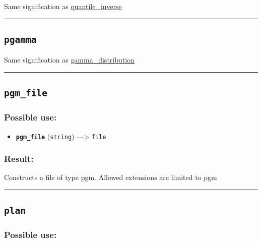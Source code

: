 \documentclass[]{book}
\providecommand{\tightlist}{%
  \setlength{\itemsep}{0pt}\setlength{\parskip}{0pt}}
\theoremstyle{definition}
\theoremstyle{definition}
\theoremstyle{definition}
\theoremstyle{remark}
\begin{document}
Same signification as
\href{OperatorsNR\#quantile_inverse}{quantile\_inverse}

\begin{center}\rule{0.5\linewidth}{\linethickness}\end{center}

\subsection{\texorpdfstring{\texttt{pgamma}}{pgamma}}\label{pgamma}

Same signification as
\href{OperatorsDH\#gamma_distribution}{gamma\_distribution}

\begin{center}\rule{0.5\linewidth}{\linethickness}\end{center}

\subsection{\texorpdfstring{\texttt{pgm\_file}}{pgm\_file}}\label{pgm_file}

\subsubsection{Possible use:}\label{possible-use-399}

\begin{itemize}
\tightlist
\item
  \textbf{\texttt{pgm\_file}} (\texttt{string}) ---\textgreater{}
  \texttt{file}
\end{itemize}

\subsubsection{Result:}\label{result-385}

Constructs a file of type pgm. Allowed extensions are limited to pgm

\begin{center}\rule{0.5\linewidth}{\linethickness}\end{center}

\subsection{\texorpdfstring{\texttt{plan}}{plan}}\label{plan}

\subsubsection{Possible use:}\label{possible-use-400}
\end{document}
